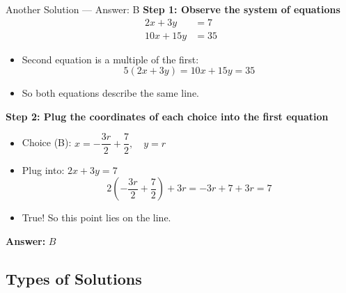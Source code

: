 \documentclass{beamer}
\begin{document}
\begin{frame}{Another Solution — Answer: B}
    \small
    \textbf{Step 1: Observe the system of equations}
    \[
    \begin{aligned}
        2x + 3y &= 7 \\
        10x + 15y &= 35
    \end{aligned}
    \]

    \begin{itemize}
        \item Second equation is a multiple of the first:
        \[
        5(2x + 3y) = 10x + 15y = 35
        \]
        \item So both equations describe the same line.
    \end{itemize}

    \textbf{Step 2: Plug the coordinates of each choice into the first equation}

    \begin{itemize}
        \item Choice (B): \( x = -\dfrac{3r}{2} + \dfrac{7}{2}, \quad y = r \)
        \item Plug into: \( 2x + 3y = 7 \)
        \[
        2\left( -\dfrac{3r}{2} + \dfrac{7}{2} \right) + 3r = -3r + 7 + 3r = 7
        \]
        \item True! So this point lies on the line.
    \end{itemize}

    \textbf{Answer:} \( \boxed{B} \)
\end{frame}

\begin{frame}
    \section{Types of Solutions}
\end{frame}
\end{document}

